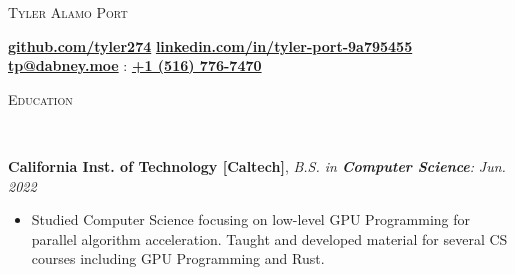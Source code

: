 \documentclass[8pt]{article}
\newenvironment{changemargin}[2]{%
  \begin{list}{}{%
    \setlength{\topsep}{0pt}%
    \setlength{\leftmargin}{#1}%
    \setlength{\rightmargin}{#2}%
    \setlength{\listparindent}{\parindent}%
    \setlength{\itemindent}{\parindent}%
    \setlength{\parsep}{0pt}%
    \setlength{\itemsep}{-2pt}%
  }%
  \item[]}{\end{list}
}
\newcommand{\lineover}{
	\begin{changemargin}{-0.05in}{-0.05in}
		\vspace*{-10pt}
		\hrulefill \\
		\vspace*{-4pt}
	\end{changemargin}
}
\newcommand{\header}[1]{
	\begin{changemargin}{-0.5in}{-0.5in}
		\scshape{#1}\\
  	\lineover
	\end{changemargin}
}
\newenvironment{body} {
	\vspace*{-10pt}
	\begin{changemargin}{-0.25in}{-0.5in}
  }	
	{\end{changemargin}
}
\begin{document}
\begin{center}
	\vspace*{-48pt}
	{\Large \scshape Tyler Alamo Port}
\end{center}
\vspace*{-4pt}
\hspace{7.25mm} \faGithub \hspace{0.25mm} \textbf{\href{https://github.com/tyler274}{github.com/tyler274}} \hspace{7.25mm} \faLinkedinSquare \hspace{0.25mm} \textbf{\href{https://linkedin.com/in/tyler-port-9a795455/}{linkedin.com/in/tyler-port-9a795455}} \\
\vspace*{1pt}  \hspace{12.25mm} \faEnvelope \hspace{0.1mm} \textbf{\href{mailto:tp@dabney.moe}{tp@dabney.moe}} \hspace{8.25mm} \faMobile : \textbf{\href{tel:+15167767470}{+1 (516) 776-7470}}\\
\vspace*{-11pt}
\smallskip

\header{Education}
\begin{body}
	\vspace{10pt}
	\textbf{California Inst. of Technology [Caltech]}{}, \emph{B.S. in
	\textbf{Computer Science}:} \hfill \emph{Jun. 2022}{} \\
	\vspace{-5pt}
	\begin{itemize} \itemsep -2pt
		\item Studied Computer Science focusing on low-level GPU Programming for parallel algorithm acceleration. Taught and developed material for several CS courses including GPU Programming and Rust.
	\end{itemize}
\end{body}

\smallskip
\vspace*{-11pt}
\end{document}
